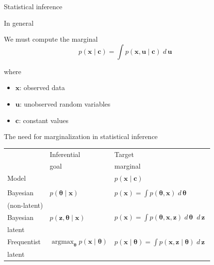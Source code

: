 \documentclass[10pt]{beamer}
\newcommand{\ds}{\displaystyle}
\newcommand{\+}[1]{\ensuremath{{\boldsymbol #1}}} %
\newcommand{\cond}{\; | \;}
\DeclareMathOperator*{\argmax}{argmax} %
\newcommand{\wrt}[1]{\; d \,{#1} \;}
\begin{document}
\begin{frame}{Statistical inference}


\begin{block}{In general}

We must compute the marginal
\begin{equation}
p(\+x \cond \+c) =  \ds\int p(\+x,\+u \cond \+c) \wrt{\+u}
\end{equation}

where 
\begin{itemize}
\item $\+x$: observed data 
\item $\+u$: unobserved random variables
\item $\+c$: constant values %
\end{itemize}

\end{block}

\end{frame}


\begin{frame}{The need for marginalization in statistical inference}


\begin{table}[ht]
\centering %
\begin{tabular}{l | l l} %
 & Inferential & Target \\
& goal & marginal   \\   [.8ex]
Model &  & $p(\+x \cond \+c)$ \\ [.8ex]
\hline \\ [.8ex] %
Bayesian  & $p(\+\theta \cond \+x)$ & $p(\+x) = \ds\int p(\+\theta,\+x) \wrt{\+\theta}$  \\ 
(non-latent) & & \\  [.8ex]
Bayesian  & $p(\+z, \+\theta \cond \+x)$ &  $p(\+x) = \ds\int p(\+\theta,\+x, \+z) \wrt{\+\theta} \wrt{\+z}$  \\
latent & & \\  [.8ex]
Frequentist  & $\argmax_{\+\theta} p(\+x \cond \+\theta)$  & $p(\+x \cond \+\theta) = \ds\int p(\+x, \+z \cond \+\theta) \wrt{\+z}$   \\
latent & &  \\ [.8ex]
\end{tabular}
\label{vi_table} %
\end{table}

\end{frame}
\end{document}
